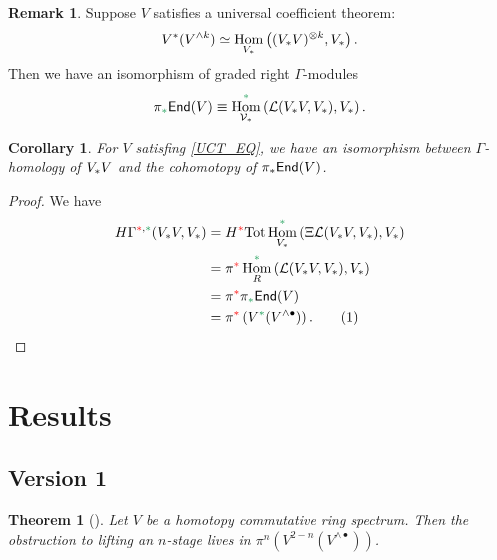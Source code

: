 \documentclass[11pt,reqno
,draft
]{amsart}
\numberwithin{equation}{section}
\numberwithin{figure}{section}
\newtheorem{theorem}[equation]{Theorem}%
\newtheorem{corollary}[equation]{Corollary}%
\theoremstyle{definition} %
\newtheorem{remark}[equation]{Remark}%
\DeclareMathOperator{\Hom}{Hom}%
\newcommand{\V}{\ensuremath{\mathcal V}}
\newcommand{\Ksi}{\Xi}
\newcommand{\Loday}{\mathcal L}
\newcommand{\redstar}{{\color{red}\**}}
\newcommand{\greenstar}{{\color{ForestGreen}\**}}
\begin{document}
\begin{remark}
        Suppose $V$ satisfies a universal coefficient theorem:
        \begin{equation}
                \label{UCT_EQ}
                V^{\**}(V^{\wedge k}) \simeq \Hom_{V_{\**}}\left( (V_{\**}V)^{\otimes k}, V_{\**} \right).
        \end{equation}
        Then we have an isomorphism of graded right $\Gamma$-modules
        \[
                \pi_{\greenstar} \mathsf{End}(V) \equiv
                \Hom_{\V_{\**}}^{\greenstar}\left( \Loday(V_{\**}V, V_{\**}), V_{\**} \right). 
          \]
\end{remark}

\begin{corollary}
        \label{COMP_COR}
        For $V$ satisfing \cref{UCT_EQ},
        we have an isomorphism between $\Gamma$-homology of $V_{\**}V$ and the cohomotopy of $\pi_{\**} \mathsf{End}(V)$.
\end{corollary}
\begin{proof}
        We have
        \begin{align*}
          H\Gamma^{\redstar, \greenstar}(V_{\**}V, V_{\**})
          &= H^{\redstar} \mathrm{Tot} \Hom_{V_{\**}}^{\greenstar} \left( \Ksi \Loday(V_{\**}V, V_{\**}), V_{\**} \right) \\
          &= \pi^{\redstar} \Hom_R^{\greenstar} \left( \Loday(V_{\**}V, V_{\**}), V_{\**} \right) \\
          &= \pi^{\redstar} \pi_{\greenstar} \mathsf{End}(V) \\
          &= \pi^{\redstar} \left( V^{\greenstar}(V^{\wedge \bullet}) \right).
            \stepcounter{equation}\tag{\theequation}\label{COMP_EQ}\\
        \end{align*}
\end{proof}


\section{Results}

\subsection{Version 1}
\begin{theorem}[{\cite[Thm. 4.13]{Rob18}}]
        Let $V$ be a homotopy commutative ring spectrum.
        Then the obstruction to lifting an $n$-stage lives in $\pi^n \left( V^{2-n}(V^{\wedge \bullet}) \right)$. 
\end{theorem}
\end{document}
